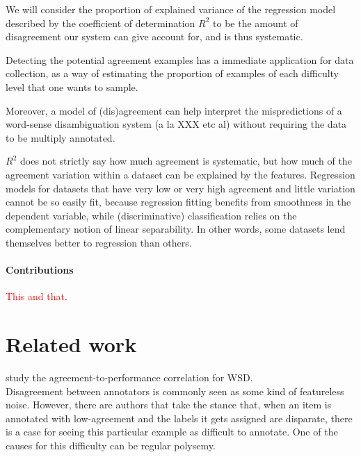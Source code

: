 \documentclass[11pt,a4paper]{article}
\begin{document}
We will consider the proportion of explained variance of the regression model described by the coefficient of determination $R^2$ to be the amount of disagreement our system can give account for, and is thus systematic. 

Detecting the potential agreement examples has a immediate application for data collection, as a way of estimating the proportion of examples of each difficulty level that one wants to sample. 

Moreover, a model of (dis)agreement can help interpret the mispredictions of a word-sense disambiguation system (a la XXX etc al) without requiring the data to be multiply annotated. 

$R^2$ does not strictly say how much agreement is systematic, but how much of the agreement variation within a dataset can be explained by the features. Regression models for datasets that have very low or very high agreement and little variation cannot be so easily fit, because regression fitting benefits from smoothness in the dependent variable, while (discriminative) classification relies on the complementary notion of linear separability. In other words, some datasets lend themselves better to regression than others.



\paragraph{Contributions} \textcolor{red}{This and that}.

\section{Related work}


\cite{Plank2014} 

\cite{Jurgens2014}

\cite{Passonneau2014}

\cite{Jurgens2013}

\cite{Lopez2015} study the agreement-to-performance correlation for WSD. \\

Disagreement between annotators is commonly seen as some kind of featureless noise. However, there are authors that take the stance that, when an item is annotated with low-agreement and the labels it gets assigned are disparate, there is a case for seeing this particular example as difficult to annotate. One of the causes for this difficulty can be regular polysemy.
\end{document}
